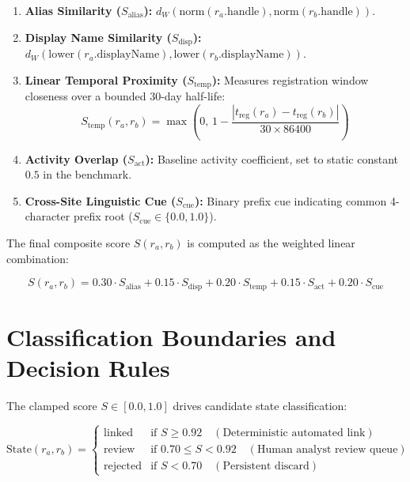 \begin{enumerate}
    \item \textbf{Alias Similarity ($S_{\text{alias}}$):} $d_W(\text{norm}(r_a.\text{handle}), \text{norm}(r_b.\text{handle}))$.
    \item \textbf{Display Name Similarity ($S_{\text{disp}}$):} $d_W(\text{lower}(r_a.\text{displayName}), \text{lower}(r_b.\text{displayName}))$.
    \item \textbf{Linear Temporal Proximity ($S_{\text{temp}}$):} Measures registration window closeness over a bounded 30-day half-life:
    \begin{equation}
    \label{eq:temporal_decay}
    S_{\text{temp}}(r_a, r_b) = \max\left(0, \, 1 - \frac{|t_{\text{reg}}(r_a) - t_{\text{reg}}(r_b)|}{30 \times 86400}\right)
    \end{equation}
    \item \textbf{Activity Overlap ($S_{\text{act}}$):} Baseline activity coefficient, set to static constant $0.5$ in the benchmark.
    \item \textbf{Cross-Site Linguistic Cue ($S_{\text{cue}}$):} Binary prefix cue indicating common 4-character prefix root ($S_{\text{cue}} \in \{0.0, 1.0\}$).
\end{enumerate}

The final composite score $S(r_a, r_b)$ is computed as the weighted linear combination:

\begin{equation}
\label{eq:composite_score}
S(r_a, r_b) = 0.30 \cdot S_{\text{alias}} + 0.15 \cdot S_{\text{disp}} + 0.20 \cdot S_{\text{temp}} + 0.15 \cdot S_{\text{act}} + 0.20 \cdot S_{\text{cue}}
\end{equation}

\section{Classification Boundaries and Decision Rules}
\label{sec:decision_rules}

The clamped score $S \in [0.0, 1.0]$ drives candidate state classification:

\begin{equation}
\label{eq:classification_rules}
\text{State}(r_a, r_b) = \begin{cases}
\text{linked} & \text{if } S \ge 0.92 \quad (\text{Deterministic automated link}) \\
\text{review} & \text{if } 0.70 \le S < 0.92 \quad (\text{Human analyst review queue}) \\
\text{rejected} & \text{if } S < 0.70 \quad (\text{Persistent discard})
\end{cases}
\end{equation}

